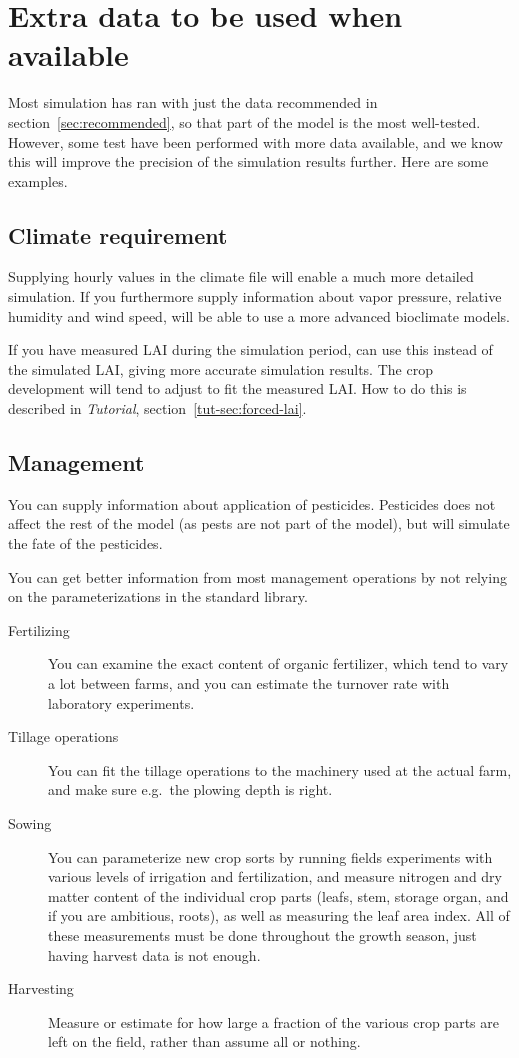 \documentclass[a4paper,11pt,twoside]{article}
\newcommand{\daisytut}{\textit{\Daisy{} Tutorial}}
\begin{document}
\section{Extra data to be used when available}

Most \daisy{} simulation has ran with just the data recommended in
section~\ref{sec:recommended}, so that part of the model is the most
well-tested.  However, some test have been performed with more data
available, and we know this will improve the precision of the
simulation results further.  Here are some examples.

\subsection{Climate requirement}

Supplying hourly values in the climate file will enable a much more
detailed simulation.  If you furthermore supply information about
vapor pressure, relative humidity and wind speed, \daisy{} will be
able to use a more advanced bioclimate models.

If you have measured LAI during the simulation period, \daisy{} can
use this instead of the simulated LAI, giving more accurate simulation
results.  The crop development will tend to adjust to fit the measured
LAI\@.  How to do this is described in \daisytut{},
section~\ref{tut-sec:forced-lai}.

\subsection{Management}

You can supply information about application of pesticides.
Pesticides does not affect the rest of the model (as pests are not
part of the model), but \daisy{} will simulate the fate of the
pesticides.

You can get better information from most management operations by not
relying on the parameterizations in the standard library.
\begin{description}
\item[Fertilizing] You can examine the exact content of organic
  fertilizer, which tend to vary a lot between farms, and you can
  estimate the turnover rate with laboratory experiments.
\item[Tillage operations] You can fit the tillage operations to the
  machinery used at the actual farm, and make sure e.g.\ the plowing
  depth is right.
\item[Sowing] You can parameterize new crop sorts by running fields
  experiments with various levels of irrigation and fertilization, and
  measure nitrogen and dry matter content of the individual crop parts
  (leafs, stem, storage organ, and if you are ambitious, roots), as
  well as measuring the leaf area index.  All of these measurements
  must be done throughout the growth season, just having harvest data
  is not enough.
\item[Harvesting] Measure or estimate for how large a fraction of the
  various crop parts are left on the field, rather than assume all or
  nothing.
\end{description}
\end{document}
